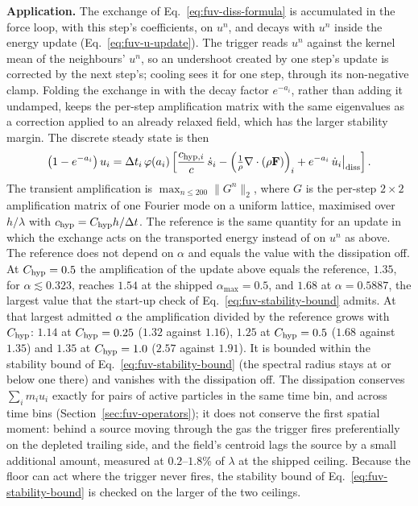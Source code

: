 \textbf{Application.} The exchange of Eq.~\ref{eq:fuv-diss-formula} is
accumulated in the force loop, with this step's coefficients, on $u^n$,
and decays with $u^n$ inside the energy update
(Eq.~\ref{eq:fuv-u-update}). The trigger reads $u^n$ against the kernel
mean of the neighbours' $u^n$, so an undershoot created by one step's
update is corrected by the next step's; cooling sees it for one step,
through its non-negative clamp. Folding the exchange in with the decay
factor $e^{-a_i}$, rather than adding it undamped, keeps the per-step
amplification matrix with the same eigenvalues as a correction applied
to an already relaxed field, which has the larger stability margin. The discrete steady
state is then
\begin{equation}
  \big(1 - e^{-a_i}\big)\,u_i = \Delta t_i\,\varphi(a_i)
    \left[\frac{c_{{\rm hyp},i}}{c}\,\dot s_i
      - \Big(\tfrac{1}{\rho}\nabla\cdot(\rho\mathbf F)\Big)_i
      + e^{-a_i}\,\dot u_i\big|_{\rm diss}\right] .
  \label{eq:fuv-diss-apply}
\end{equation}
The transient amplification is $\max_{n\le200}\|G^n\|_2$, where $G$ is the
per-step $2\times2$ amplification matrix of one Fourier mode on a uniform
lattice, maximised over $h/\lambda$ with $c_{\rm hyp} = C_{\rm hyp}h/\Delta t$.
The reference is the same quantity for an update in which the exchange acts on
the transported energy instead of on $u^n$ as above. The reference does not
depend on $\alpha$ and equals the value with the dissipation off. At
$C_{\rm hyp} = 0.5$ the amplification of the update above equals the reference,
$1.35$, for $\alpha\lesssim0.323$, reaches $1.54$ at the shipped
$\alpha_{\max} = 0.5$, and $1.68$ at $\alpha = 0.5887$, the largest value that
the start-up check of Eq.~\ref{eq:fuv-stability-bound} admits. At that largest
admitted $\alpha$ the amplification divided by the reference grows with
$C_{\rm hyp}$: $1.14$ at $C_{\rm hyp} = 0.25$ ($1.32$ against $1.16$), $1.25$ at
$C_{\rm hyp} = 0.5$ ($1.68$ against $1.35$) and $1.35$ at $C_{\rm hyp} = 1.0$
($2.57$ against $1.91$).
It is bounded within the stability bound of
Eq.~\ref{eq:fuv-stability-bound} (the spectral radius stays at or below
one there) and vanishes with the dissipation off. The dissipation conserves $\sum_i m_i u_i$ exactly
for pairs of active particles in the same time bin, and across time bins
(Section~\ref{sec:fuv-operators});
it does not conserve the first spatial moment: behind a source moving through the
gas the trigger fires preferentially on the depleted trailing side, and
the field's centroid lags the source by a small additional amount,
measured at $0.2$--$1.8\%$ of $\lambda$ at the shipped ceiling. Because
the floor can act where the trigger never fires, the stability bound of
Eq.~\ref{eq:fuv-stability-bound} is checked on the larger of the two
ceilings.

